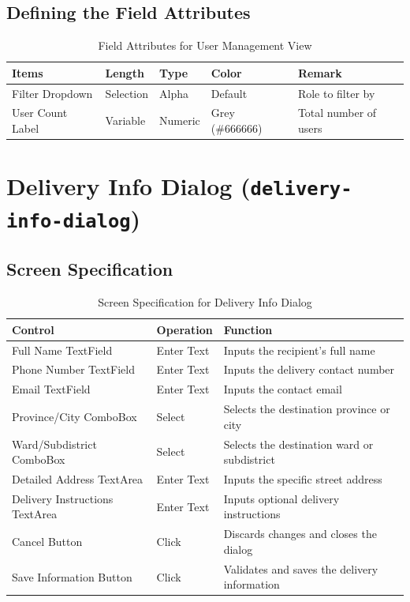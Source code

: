 \documentclass{article}
\begin{document}
\subsection{Defining the Field Attributes}
\begin{table}[h!]
\centering
\begin{tabularx}{\textwidth}{|l|l|l|l|X|}
\hline
\textbf{Items} & \textbf{Length} & \textbf{Type} & \textbf{Color} & \textbf{Remark} \\
\hline
Filter Dropdown & Selection & Alpha & Default & Role to filter by \\
\hline
User Count Label & Variable & Numeric & Grey (\#666666) & Total number of users \\
\hline
\end{tabularx}
\caption{Field Attributes for User Management View}
\end{table}

\section{Delivery Info Dialog (\texttt{delivery-info-dialog})}
\subsection{Screen Specification}
\begin{table}[h!]
\centering
\begin{tabularx}{\textwidth}{|l|l|X|}
\hline
\textbf{Control} & \textbf{Operation} & \textbf{Function} \\
\hline
Full Name TextField & Enter Text & Inputs the recipient's full name \\
\hline
Phone Number TextField & Enter Text & Inputs the delivery contact number \\
\hline
Email TextField & Enter Text & Inputs the contact email \\
\hline
Province/City ComboBox & Select & Selects the destination province or city \\
\hline
Ward/Subdistrict ComboBox & Select & Selects the destination ward or subdistrict \\
\hline
Detailed Address TextArea & Enter Text & Inputs the specific street address \\
\hline
Delivery Instructions TextArea & Enter Text & Inputs optional delivery instructions \\
\hline
Cancel Button & Click & Discards changes and closes the dialog \\
\hline
Save Information Button & Click & Validates and saves the delivery information \\
\hline
\end{tabularx}
\caption{Screen Specification for Delivery Info Dialog}
\end{table}
\end{document}
